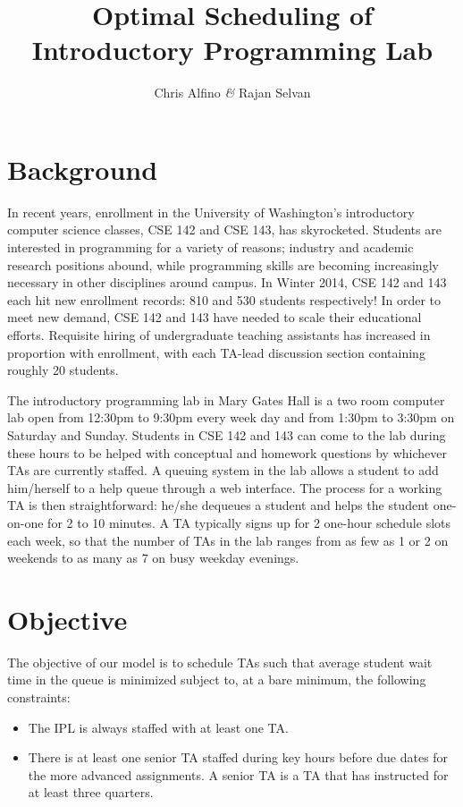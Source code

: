 \documentclass{article}
\begin{document}
\title{\textbf{Optimal Scheduling of Introductory Programming Lab}}
\author{Chris Alfino \textit{\&} Rajan Selvan}
\maketitle

\setlength\columnsep{0.45in}
\begin{multicols}{2}

\section*{Background}

In recent years, enrollment in the University of Washington's introductory computer science classes, CSE 142 and CSE 143, has skyrocketed. Students are interested in programming for a variety of reasons; industry and academic research positions abound, while programming skills are becoming increasingly necessary in other disciplines around campus. In Winter 2014, CSE 142 and 143 each hit new enrollment records: 810 and 530 students respectively! In order to meet new demand, CSE 142 and 143 have needed to scale their educational efforts. Requisite hiring of undergraduate teaching assistants has increased in proportion with enrollment, with each TA-lead discussion section containing roughly 20 students.

The introductory programming lab in Mary Gates Hall is a two room computer lab open from 12:30pm to 9:30pm every week day and from 1:30pm to 3:30pm on Saturday and Sunday. Students in CSE 142 and 143 can come to the lab during these hours to be helped with conceptual and homework questions by whichever TAs are currently staffed. A queuing system in the lab allows a student to add him/herself to a help queue through a web interface. The process for a working TA is then straightforward: he/she dequeues a student and helps the student one-on-one for 2 to 10 minutes. A TA typically signs up for 2 one-hour schedule slots each week, so that the number of TAs in the lab ranges from as few as 1 or 2 on weekends to as many as 7 on busy weekday evenings.

\section*{Objective}

The objective of our model is to schedule TAs such that average student wait time in the queue is minimized subject to, at a bare minimum, the following constraints:
\begin{itemize}
    \item The IPL is always staffed with at least one TA.
    \item There is at least one senior TA staffed during key hours before due dates for the more advanced assignments. A senior TA is a TA that has instructed for at least three quarters.
\end{itemize}


\end{multicols}
\end{document}
